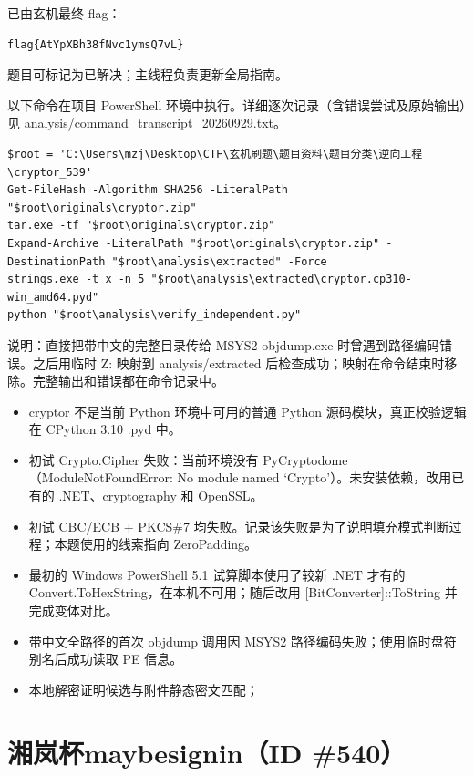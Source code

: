已由玄机最终 flag：

\begin{verbatim}
flag{AtYpXBh38fNvc1ymsQ7vL}
\end{verbatim}

题目可标记为已解决；主线程负责更新全局指南。

以下命令在项目 PowerShell 环境中执行。详细逐次记录（含错误尝试及原始输出）见 analysis/command\_transcript\_20260929.txt。

\begin{verbatim}
$root = 'C:\Users\mzj\Desktop\CTF\玄机刷题\题目资料\题目分类\逆向工程\cryptor_539'
Get-FileHash -Algorithm SHA256 -LiteralPath "$root\originals\cryptor.zip"
tar.exe -tf "$root\originals\cryptor.zip"
Expand-Archive -LiteralPath "$root\originals\cryptor.zip" -DestinationPath "$root\analysis\extracted" -Force
strings.exe -t x -n 5 "$root\analysis\extracted\cryptor.cp310-win_amd64.pyd"
python "$root\analysis\verify_independent.py"
\end{verbatim}

说明：直接把带中文的完整目录传给 MSYS2 objdump.exe 时曾遇到路径编码错误。之后用临时 Z: 映射到 analysis/extracted 后检查成功；映射在命令结束时移除。完整输出和错误都在命令记录中。

\begin{itemize}
\tightlist
\item
  cryptor 不是当前 Python 环境中可用的普通 Python 源码模块，真正校验逻辑在 CPython 3.10 .pyd 中。
\item
  初试 Crypto.Cipher 失败：当前环境没有 PyCryptodome（ModuleNotFoundError: No module named `Crypto'）。未安装依赖，改用已有的 .NET、cryptography 和 OpenSSL。
\item
  初试 CBC/ECB + PKCS\#7 均失败。记录该失败是为了说明填充模式判断过程；本题使用的线索指向 ZeroPadding。
\item
  最初的 Windows PowerShell 5.1 试算脚本使用了较新 .NET 才有的 Convert.ToHexString，在本机不可用；随后改用 {[}BitConverter{]}::ToString 并完成变体对比。
\item
  带中文全路径的首次 objdump 调用因 MSYS2 路径编码失败；使用临时盘符别名后成功读取 PE 信息。
\item
  本地解密证明候选与附件静态密文匹配；
\end{itemize}

\section{湘岚杯maybesignin（ID \#540）}\label{ux6e58ux5c9aux676fmaybesigninid-540}

